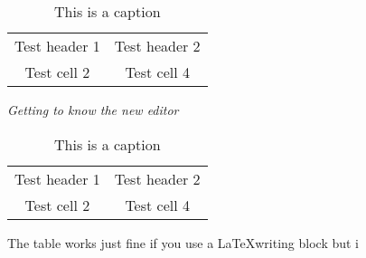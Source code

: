 \begin{table} 
    \begin{tabular}{ c c }
        Test header 1 & Test header 2 \\ 
        Test cell 2 & Test cell 4 \\ 
    \end{tabular} 
    \caption{This is a caption} 
\end{table}\textit{Getting to know the new editor}

\begin{table} 
    \begin{tabular}{ c c }
        Test header 1 & Test header 2 \\ 
        Test cell 2 & Test cell 4 \\ 
    \end{tabular} 
    \caption{This is a caption} 
\end{table}

The table works just fine if you use a \LaTeX writing block but i
